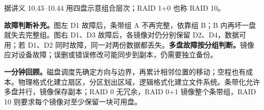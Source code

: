 \begin{center}


{\small 据讲义 10.43--10.44 用四盘示意组合层次；RAID 1+0 也称 RAID 10。}
\end{center}

\textbf{故障判断补充。}图左 D1 故障后，条带组 A 不再完整，依靠组 B；B 内再坏一盘就失去完整组。图右 D1、D3 故障后，各镜像对仍分别保留 D2、D4，数据可用；若 D1、D2 同时故障，同一对两份数据都丢失。\textbf{多盘故障按分组判断。}镜像应对设备故障；误删或错误修改可能同步到副本，仍需要独立备份。

\textbf{一分钟回顾。}磁盘调度先确定方向与边界，再累计相邻位置的移动；空程也有成本。物理格式化建立扇区，分区划出区域，逻辑格式化建立文件系统。条带化允许多盘并行，镜像保存副本；RAID 0 无冗余，RAID 0+1 镜像整个条带组，RAID 10 则要求每个镜像对至少保留一块可用盘。
\endgroup
